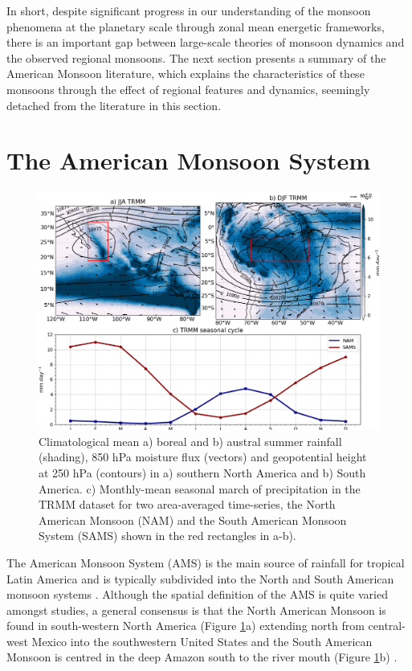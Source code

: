 In short, despite significant progress in our understanding of the monsoon phenomena at the planetary scale through zonal mean energetic frameworks, there is an important gap between large-scale theories of monsoon dynamics and the observed regional monsoons. 
The next section presents a summary of the American Monsoon literature, which explains the characteristics of these monsoons through the effect of regional features and dynamics, seemingly detached from the literature in this section.

\section{The American Monsoon System}\label{sq:bk_ams}

\begin{figure}[t!]
\includegraphics[width=\linewidth]{figures/amsclim.png}
\caption[The American monsoon system climatology]{ Climatological mean a) boreal and b) austral summer rainfall (shading), 850 hPa moisture flux (vectors) and geopotential height at 250 hPa (contours) in a) southern North America and b) South America. c) Monthly-mean seasonal march of precipitation in the TRMM dataset for two area-averaged time-series, the North American Monsoon (NAM) and the South American Monsoon System (SAMS) shown in the red rectangles in a-b). }
\label{fig:americanmonsoon}
\end{figure}

The American Monsoon System (AMS) is the main source of rainfall for tropical Latin America and is typically subdivided into the North and South American monsoon systems \citep{vera2006}. 
Although the spatial definition of the AMS is quite varied amongst studies, a general consensus is that the North American Monsoon is found in south-western North America (Figure \ref{fig:americanmonsoon}a) extending north from central-west Mexico into the southwestern United States and the South American Monsoon is centred in the deep Amazon south to the river mouth (Figure \ref{fig:americanmonsoon}b) \citep{adams1997,stensrud1997,vera2006}.


